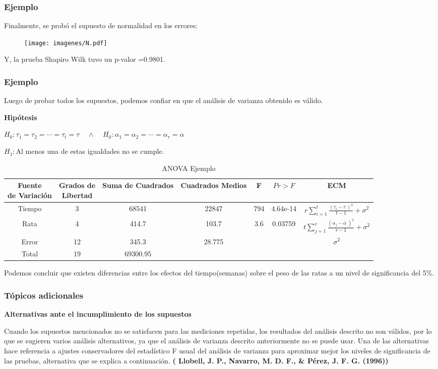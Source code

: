 \documentclass[12pt]{beamer}
\begin{document}
\begin{frame}
\frametitle{Ejemplo}
Finalmente, se probó el supuesto de normalidad en los errores:
\begin{figure}[h!]
  \centering
  \texttt{[image: imagenes/N.pdf]}
\end{figure}
Y, la prueba Shapiro Wilk tuvo un p-valor =0.9801.
\end{frame}

\begin{frame}
\frametitle{Ejemplo}
Luego de probar todos los supuestos, podemos confiar en que el análisis de varianza obtenido es válido.

\textbf{Hipótesis}
\begin{center}
$H_0:\tau_1=\tau_2=\cdots=\tau_t=\tau \;\;\;\; \wedge \;\;\;\; H_0:\alpha_1=\alpha_2=\cdots=\alpha_r=\alpha $

$H_1:$Al menos una de estas igualdades no se cumple.
\end{center}
\begin{table}[htbp]
  \centering
\resizebox{10cm}{!} {
\begin{tabular}{|c|c|c|c|c|c|c|}
\hline 
\parbox{7em}{\centering Fuente\\ de Variación} & \parbox{7em}{\centering Grados de\\ Libertad} & Suma de Cuadrados & Cuadrados Medios & F & $Pr>F$ & ECM \\ 
\hline 
Tiempo & 3 & 68541 & 22847 & 794 & 4.64e-14  & $r\sum\limits_{i=1}^{t}\frac{(\tau_i-\bar{\tau_{.}})^2}{t-1}+\sigma^2$\\ 
Rata & 4 & 414.7 & 103.7 & 3.6 & 0.03759 &$t\sum\limits_{j=1}^{r}\frac{(\alpha_{j}-\bar{\alpha_{.}})^2}{r-1}+\sigma^2$ \\
Error & 12 & 345.3 & 28.775 &   & & $\sigma^2$\\ 
Total & 19 & 69300.95 &  &   & &\\ 
\hline 
\end{tabular} 
}
\caption{ANOVA Ejemplo}
\label{tab:addlabel}%
\end{table}%
Podemos concluir que existen diferencias entre los efectos del tiempo(semanas) sobre el peso de las ratas a un nivel de
significancia del 5\%.
\end{frame}

\begin{frame}
\frametitle{Tópicos adicionales}
\textbf{Alternativas ante el incumplimiento de los supuestos}

Cuando los supuestos mencionados no se satisfacen para las mediciones repetidas, los resultados
del análisis descrito no son válidos, por lo que se sugieren varios análisis alternativos, ya que el
análisis de varianza descrito anteriormente no se puede usar. Una de las alternativas hace
referencia a ajustes conservadores del estadístico F usual del análisis de varianza para aproximar
mejor los niveles de significancia de las pruebas, alternativa que se explica a continuación.
\textbf{( Llobell, J. P., Navarro, M. D. F., \& Pérez, J. F. G. (1996))}
\end{frame}
\end{document}
